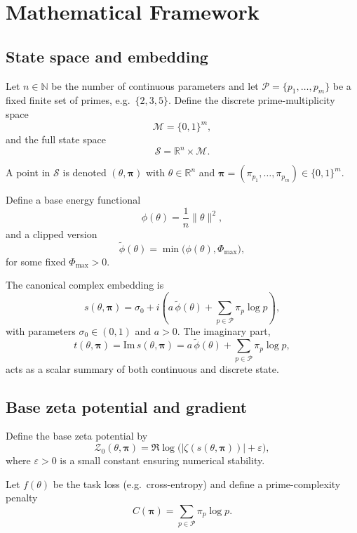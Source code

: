 \documentclass[11pt]{article}
\begin{document}
\section{Mathematical Framework}

\subsection{State space and embedding}

Let $n \in \mathbb{N}$ be the number of continuous parameters and let $\mathcal{P} = \{p_1,\dots,p_m\}$ be a fixed finite set of primes, e.g.\ $\{2,3,5\}$. Define the discrete prime-multiplicity space
\[
  \mathcal{M} = \{0,1\}^m,
\]
and the full state space
\[
  \mathcal{S} = \mathbb{R}^n \times \mathcal{M}.
\]

A point in $\mathcal{S}$ is denoted $(\theta,\bm{\pi})$ with $\theta \in \mathbb{R}^n$ and $\bm{\pi} = (\pi_{p_1},\dots,\pi_{p_m}) \in \{0,1\}^m$.

Define a base energy functional
\[
  \phi(\theta) = \frac{1}{n}\|\theta\|^2,
\]
and a clipped version
\[
  \tilde{\phi}(\theta) = \min\big(\phi(\theta), \Phi_{\max}\big),
\]
for some fixed $\Phi_{\max} > 0$.

The canonical complex embedding is
\begin{equation}
  s(\theta,\bm{\pi}) = \sigma_0 + i\left(a\,\tilde{\phi}(\theta) + \sum_{p\in\mathcal{P}} \pi_p \log p\right),
  \label{eq:embedding}
\end{equation}
with parameters $\sigma_0 \in (0,1)$ and $a>0$. The imaginary part,
\[
  t(\theta,\bm{\pi}) = \mathrm{Im}\, s(\theta,\bm{\pi}) = a\,\tilde{\phi}(\theta) + \sum_{p\in\mathcal{P}} \pi_p \log p,
\]
acts as a scalar summary of both continuous and discrete state.

\subsection{Base zeta potential and gradient}

Define the base zeta potential by
\begin{equation}
  \mathcal{Z}_0(\theta,\bm{\pi}) = \Re \log\big(|\zeta(s(\theta,\bm{\pi}))| + \varepsilon\big),
  \label{eq:zeta_potential_base}
\end{equation}
where $\varepsilon>0$ is a small constant ensuring numerical stability.

Let $f(\theta)$ be the task loss (e.g.\ cross-entropy) and define a prime-complexity penalty
\[
  C(\bm{\pi}) = \sum_{p\in\mathcal{P}} \pi_p \log p.
\]
\end{document}
